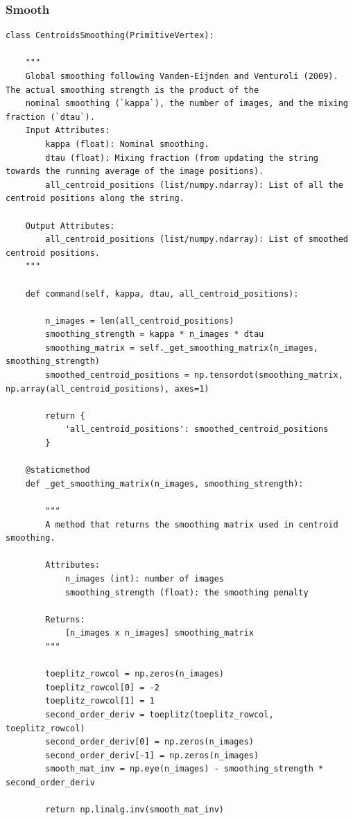 \documentclass{article}
\begin{document}
\subsubsection{Smooth}

\begin{lstlisting}
class CentroidsSmoothing(PrimitiveVertex):

    """
    Global smoothing following Vanden-Eijnden and Venturoli (2009). The actual smoothing strength is the product of the
    nominal smoothing (`kappa`), the number of images, and the mixing fraction (`dtau`).
    Input Attributes:
        kappa (float): Nominal smoothing.
        dtau (float): Mixing fraction (from updating the string towards the running average of the image positions).
        all_centroid_positions (list/numpy.ndarray): List of all the centroid positions along the string.

    Output Attributes:
        all_centroid_positions (list/numpy.ndarray): List of smoothed centroid positions.
    """

    def command(self, kappa, dtau, all_centroid_positions):

        n_images = len(all_centroid_positions)
        smoothing_strength = kappa * n_images * dtau
        smoothing_matrix = self._get_smoothing_matrix(n_images, smoothing_strength)
        smoothed_centroid_positions = np.tensordot(smoothing_matrix, np.array(all_centroid_positions), axes=1)

        return {
            'all_centroid_positions': smoothed_centroid_positions
        }

    @staticmethod
    def _get_smoothing_matrix(n_images, smoothing_strength):

        """
        A method that returns the smoothing matrix used in centroid smoothing.

        Attributes:
            n_images (int): number of images
            smoothing_strength (float): the smoothing penalty

        Returns:
            [n_images x n_images] smoothing_matrix
        """

        toeplitz_rowcol = np.zeros(n_images)
        toeplitz_rowcol[0] = -2
        toeplitz_rowcol[1] = 1
        second_order_deriv = toeplitz(toeplitz_rowcol, toeplitz_rowcol)
        second_order_deriv[0] = np.zeros(n_images)
        second_order_deriv[-1] = np.zeros(n_images)
        smooth_mat_inv = np.eye(n_images) - smoothing_strength * second_order_deriv

        return np.linalg.inv(smooth_mat_inv)
\end{lstlisting} 
\end{document}
